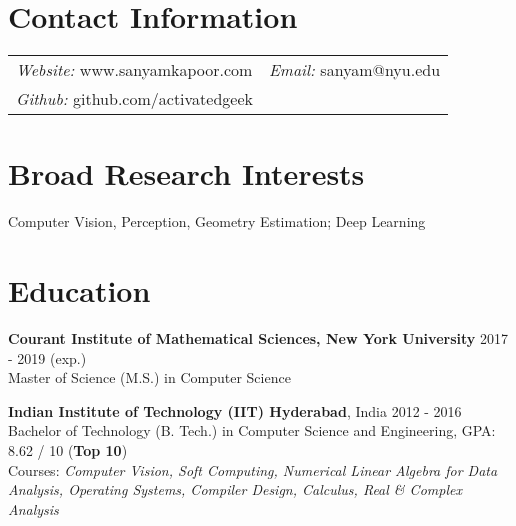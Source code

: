 \documentclass[margin,line]{res}
\begin{document}

\begin{resume}

\section{\sc Contact Information}

  \begin{tabular}{@{}p{2.9in}p{6in}}
	{\it Website:} www.sanyamkapoor.com & {\it Email:} sanyam@nyu.edu \\
	{\it Github:} github.com/activatedgeek  \\
  \end{tabular}

  \vspace*{-3.5mm}

\section{\sc Broad Research Interests}
  Computer Vision, Perception, Geometry Estimation; Deep Learning

\section{\sc Education}

  {\bf Courant Institute of Mathematical Sciences, New York University} \hfill 2017 - 2019 (exp.) \\
  	Master of Science (M.S.) in Computer Science

  \vspace*{-3.5mm}

  {\bf Indian Institute of Technology (IIT) Hyderabad}, India \hfill 2012 - 2016 \\
  	Bachelor of Technology (B. Tech.) in Computer Science and Engineering,
	GPA: 8.62 / 10 ({\bf Top 10}) \\
    Courses: \it{Computer Vision, Soft Computing, Numerical Linear Algebra for Data Analysis, Operating Systems, Compiler Design, Calculus, Real \& Complex Analysis}

  \vspace*{-3.5mm}

  \begin{comment}
  {\bf La Montessori School}, Kullu, HP, India \hfill 2010 - 2012 \\
	Intermediate (Physics, Mathematics, Chemistry),
    Percentage Score: 93.4\% ({\bf Rank 1})


\end{comment}
\end{resume}
\end{document}
